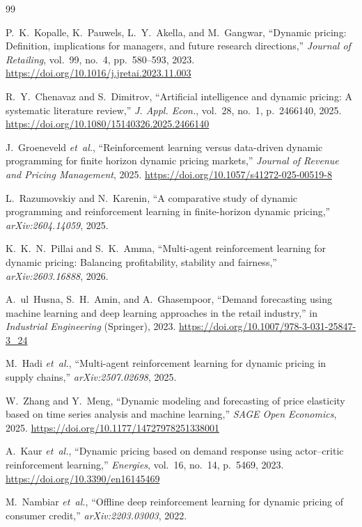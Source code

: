 \documentclass[journal, 10pt, twoside]{IEEEtran}
\begin{document}
\begin{thebibliography}{99}

P.~K.~Kopalle, K.~Pauwels, L.~Y.~Akella, and M.~Gangwar,
``Dynamic pricing: Definition, implications for managers, and future
research directions,''
\textit{Journal of Retailing}, vol.~99, no.~4, pp.~580--593, 2023.
\url{https://doi.org/10.1016/j.jretai.2023.11.003}

R.~Y.~Chenavaz and S.~Dimitrov,
``Artificial intelligence and dynamic pricing: A systematic literature
review,''
\textit{J. Appl. Econ.}, vol.~28, no.~1, p.~2466140, 2025.
\url{https://doi.org/10.1080/15140326.2025.2466140}

J.~Groeneveld \textit{et~al.},
``Reinforcement learning versus data-driven dynamic programming for
finite horizon dynamic pricing markets,''
\textit{Journal of Revenue and Pricing Management}, 2025.
\url{https://doi.org/10.1057/s41272-025-00519-8}

L.~Razumovskiy and N.~Karenin,
``A comparative study of dynamic programming and reinforcement learning
in finite-horizon dynamic pricing,''
\textit{arXiv:2604.14059}, 2025.

K.~K.~N.~Pillai and S.~K.~Amma,
``Multi-agent reinforcement learning for dynamic pricing: Balancing
profitability, stability and fairness,''
\textit{arXiv:2603.16888}, 2026.

A.~ul~Husna, S.~H.~Amin, and A.~Ghasempoor,
``Demand forecasting using machine learning and deep learning approaches
in the retail industry,''
in \textit{Industrial Engineering} (Springer), 2023.
\url{https://doi.org/10.1007/978-3-031-25847-3_24}

M.~Hadi \textit{et~al.},
``Multi-agent reinforcement learning for dynamic pricing in supply
chains,''
\textit{arXiv:2507.02698}, 2025.

W.~Zhang and Y.~Meng,
``Dynamic modeling and forecasting of price elasticity based on time
series analysis and machine learning,''
\textit{SAGE Open Economics}, 2025.
\url{https://doi.org/10.1177/14727978251338001}

A.~Kaur \textit{et~al.},
``Dynamic pricing based on demand response using actor--critic
reinforcement learning,''
\textit{Energies}, vol.~16, no.~14, p.~5469, 2023.
\url{https://doi.org/10.3390/en16145469}

M.~Nambiar \textit{et~al.},
``Offline deep reinforcement learning for dynamic pricing of consumer
credit,''
\textit{arXiv:2203.03003}, 2022.


\end{thebibliography}
\end{document}
